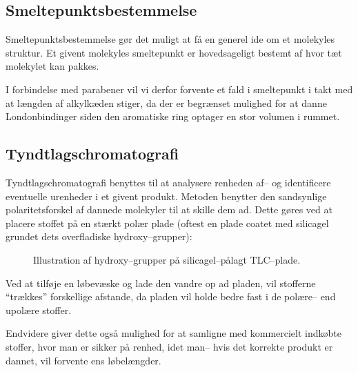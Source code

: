     \subsection{Smeltepunktsbestemmelse}
    Smeltepunktsbestemmelse gør det muligt at få en generel ide om et molekyles struktur. Et givent molekyles smeltepunkt er hovedsageligt bestemt af hvor tæt molekylet kan pakkes. 

    I forbindelse med parabener vil vi derfor forvente et fald i smeltepunkt i takt med at længden af alkylkæden stiger, da der er begrænset mulighed for at danne Londonbindinger siden den aromatiske ring optager en stor volumen i rummet.

    \subsection{Tyndtlagschromatografi}
    Tyndtlagschromatografi benyttes til at analysere renheden af-- og identificere eventuelle urenheder i et givent produkt. Metoden benytter den sandsynlige polaritetsforskel af dannede molekyler til at skille dem ad. Dette gøres ved at placere stoffet på en stærkt polær plade (oftest en plade coatet med silicagel grundet dets overfladiske hydroxy--grupper):
    \begin{figure}[H]
        \caption{Illustration af hydroxy--grupper på silicagel--pålagt TLC--plade.}
    \end{figure}
    Ved at tilføje en løbevæske og lade den vandre op ad pladen, vil stofferne ``trækkes'' forskellige afstande, da pladen vil holde bedre fast i de polære-- end upolære stoffer.

    Endvidere giver dette også mulighed for at samligne med kommercielt indkøbte stoffer, hvor man er sikker på renhed, idet man-- hvis det korrekte produkt er dannet, vil forvente ens løbelængder.
    
